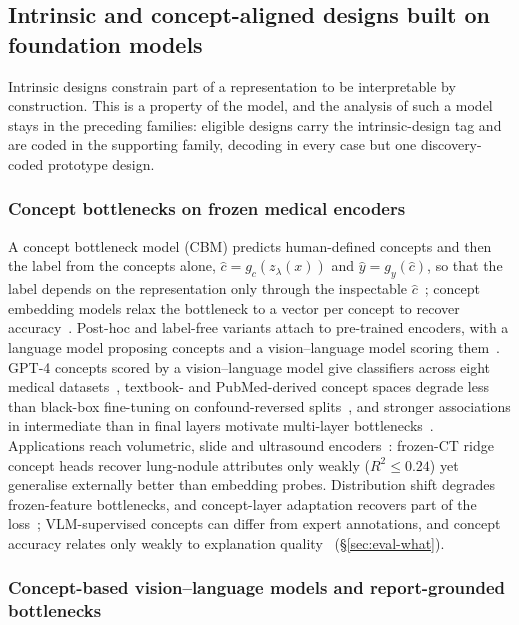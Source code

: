 \subsection{Intrinsic and concept-aligned designs built on foundation models}
\label{sec:intrinsic}

Intrinsic designs constrain part of a representation to be interpretable by construction. This is a
property of the model, and the analysis of such a model stays in the preceding families: eligible
designs carry the intrinsic-design tag and are coded in the supporting family, decoding in every case
but one discovery-coded prototype design.

\subsubsection{Concept bottlenecks on frozen medical encoders}

A concept bottleneck model (CBM) predicts
human-defined concepts and then the label from the concepts alone, $\hat c=g_c(z_\lambda(x))$ and
$\hat y=g_y(\hat c)$, so that the label depends on the representation only through the inspectable
$\hat c$~\cite{koh2020concept}; concept embedding models relax the bottleneck to a vector per concept to
recover accuracy~\cite{zarlenga2022concept}. Post-hoc and label-free variants attach to pre-trained
encoders, with a language model proposing concepts and a vision--language model scoring
them~\cite{yuksekgonul2022post,oikarinen2023label,yang2022language}. GPT-4 concepts scored by a
vision--language model give classifiers across eight medical datasets~\cite{yan2023robust}, textbook-
and PubMed-derived concept spaces degrade less than black-box fine-tuning on confound-reversed
splits~\cite{yang2024textbook}, and stronger associations in intermediate than in final layers motivate
multi-layer bottlenecks~\cite{wang2025mvp}. Applications reach volumetric, slide and ultrasound
encoders~\cite{rojas2026echopcbm,tushar2026distilling,gao2025evaluating,sun2025label}: frozen-CT ridge
concept heads recover lung-nodule attributes only weakly ($R^2\le 0.24$) yet generalise externally
better than embedding probes. Distribution shift degrades frozen-feature bottlenecks, and concept-layer
adaptation recovers part of the loss~\cite{choi2024adaptive}; VLM-supervised concepts can differ from
expert annotations, and concept accuracy relates only weakly to explanation
quality~\cite{debole2025if} (\S\ref{sec:eval-what}).

\subsubsection{Concept-based vision--language models and report-grounded bottlenecks}

